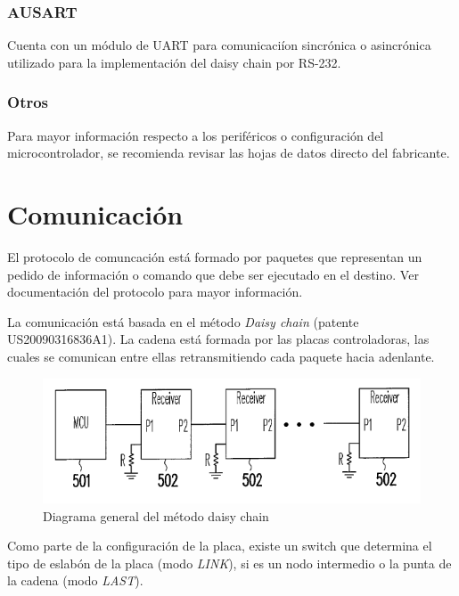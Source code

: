 \documentclass[a4paper,10pt]{article}
\begin{document}
\subsubsection{AUSART}
\label{ausart}

Cuenta con un m\'odulo de UART para comunicaci\'ion sincr\'onica o asincr\'onica utilizado para la implementaci\'on del daisy chain por RS-232.

\subsubsection{Otros}
\label{otros}

Para mayor informaci\'on respecto a los perif\'ericos o configuraci\'on del microcontrolador, se recomienda revisar las hojas de datos directo del fabricante.

\section{Comunicaci\'on}
\label{comunicacion}

El protocolo de comuncaci\'on est\'a formado por paquetes que representan un pedido de informaci\'on o comando que debe ser ejecutado en el destino.
Ver documentaci\'on del protocolo para mayor informaci\'on.

La comunicaci\'on est\'a basada en el m\'etodo \emph{Daisy chain} (patente US20090316836A1).
La cadena est\'a formada por las placas controladoras, las cuales se comunican entre ellas retransmitiendo cada paquete hacia adenlante.

\begin{figure}
\centering
\includegraphics[scale=.5]{daisychain_diagram.png}
\caption{Diagrama general del m\'etodo daisy chain}
\label{daisychain_diagram}
\end{figure}

Como parte de la configuraci\'on de la placa, existe un switch que determina el tipo de eslab\'on de la placa (modo \emph{LINK}), si es un nodo intermedio
o la punta de la cadena (modo \emph{LAST}).
\end{document}
